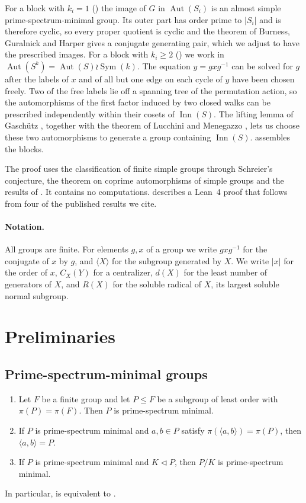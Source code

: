 \documentclass[11pt,colorlinks]{charlie}
\DeclareMathOperator{\Aut}{Aut}
\DeclareMathOperator{\Inn}{Inn}
\DeclareMathOperator{\Sym}{Sym}
\newcommand{\gen}[1]{\langle #1\rangle}
\begin{document}
For a block with $k_i=1$ () the image of $G$ in $\Aut(S_i)$ is an almost simple prime-spectrum-minimal group. Its outer part has order prime to $|S_i|$ and is therefore cyclic, so every proper quotient is cyclic and the theorem of Burness, Guralnick and Harper \cite{BGH} gives a conjugate generating pair, which we adjust to have the prescribed images. For a block with $k_i\ge2$ () we work in $\Aut(S^k)=\Aut(S)\wr\Sym(k)$. The equation $y=gxg^{-1}$ can be solved for $g$ after the labels of $x$ and of all but one edge on each cycle of $y$ have been chosen freely. Two of the free labels lie off a spanning tree of the permutation action, so the automorphisms of the first factor induced by two closed walks can be prescribed independently within their cosets of $\Inn(S)$. The lifting lemma of Gasch\"utz \cite{Gaschutz}, together with the theorem of Lucchini and Menegazzo \cite{LM}, lets us choose these two automorphisms to generate a group containing $\Inn(S)$.  assembles the blocks.

The proof uses the classification of finite simple groups through Schreier's conjecture, the theorem on coprime automorphisms of simple groups \cite[Theorem~5.1]{SV} and the results of \cite{BGH}. It contains no computations.  describes a Lean~4 proof that  follows from four of the published results we cite.

\paragraph{Notation.}
All groups are finite. For elements $g,x$ of a group we write $gxg^{-1}$ for the conjugate of $x$ by $g$, and $\gen{X}$ for the subgroup generated by $X$. We write $|x|$ for the order of $x$, $C_X(Y)$ for a centralizer, $d(X)$ for the least number of generators of $X$, and $R(X)$ for the soluble radical of $X$, its largest soluble normal subgroup.

\section{Preliminaries}\label{sec:prelim}

\subsection{Prime-spectrum-minimal groups}\label{sec:reduction}

\begin{lemma}\label{lem:reduction}
\begin{enumerate}
\item Let $F$ be a finite group and let $P\le F$ be a subgroup of least order with $\pi(P)=\pi(F)$. Then $P$ is prime-spectrum minimal.
\item If $P$ is prime-spectrum minimal and $a,b\in P$ satisfy $\pi(\gen{a,b})=\pi(P)$, then $\gen{a,b}=P$.
\item If $P$ is prime-spectrum minimal and $K\lhd P$, then $P/K$ is prime-spectrum minimal.
\end{enumerate}
In particular,  is equivalent to .
\end{lemma}
\end{document}
